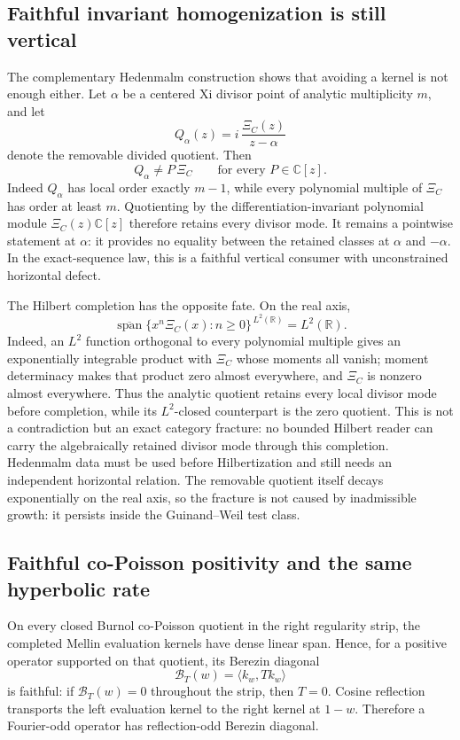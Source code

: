 \documentclass[11pt]{article}
\theoremstyle{definition}
\theoremstyle{remark}
\newcommand{\C}{\mathbb C}
\newcommand{\R}{\mathbb R}
\newcommand{\cB}{\mathcal B}
\begin{document}
\subsection{Faithful invariant homogenization is still vertical}

The complementary Hedenmalm construction shows that avoiding a kernel is
not enough either.  Let \(\alpha\) be a centered Xi divisor point of analytic
multiplicity \(m\), and let
\[
 Q_\alpha(z)=i\,\frac{\Xi_C(z)}{z-\alpha}
\]
denote the removable divided quotient.  Then
\[
        Q_\alpha\ne P\,\Xi_C
        \qquad\text{for every }P\in\C[z].
\tag{5.8e}\label{eq:hedenmalm-invariant-homogenization-faithful}
\]
Indeed \(Q_\alpha\) has local order exactly \(m-1\), while every polynomial
multiple of \(\Xi_C\) has order at least \(m\).  Quotienting by the
differentiation-invariant polynomial module
\(\Xi_C(z)\C[z]\) therefore retains every divisor mode.  It remains a
pointwise statement at \(\alpha\): it provides no equality between the
retained classes at \(\alpha\) and \(-\alpha\).  In the exact-sequence law,
this is a faithful vertical consumer with unconstrained horizontal defect.

The Hilbert completion has the opposite fate.  On the real axis,
\[
 \overline{\operatorname{span}}\{
          x^n\Xi_C(x):n\ge0\}^{\,L^2(\R)}=L^2(\R).
\tag{5.8f}\label{eq:xi-polynomial-density}
\]
Indeed, an \(L^2\) function orthogonal to every polynomial multiple gives
an exponentially integrable product with \(\Xi_C\) whose moments all
vanish; moment determinacy makes that product zero almost everywhere, and
\(\Xi_C\) is nonzero almost everywhere.  Thus the analytic quotient retains
every local divisor mode before completion, while its \(L^2\)-closed
counterpart is the zero quotient.  This is not a contradiction but an exact
category fracture: no bounded Hilbert reader can carry the algebraically
retained divisor mode through this completion.  Hedenmalm data must be used
before Hilbertization and still needs an independent horizontal relation.
The removable quotient itself decays exponentially on the real axis, so the
fracture is not caused by inadmissible growth: it persists inside the
Guinand--Weil test class.

\subsection{Faithful co-Poisson positivity and the same hyperbolic rate}

On every closed Burnol co-Poisson quotient in the right regularity strip,
the completed Mellin evaluation kernels have dense linear span.  Hence,
for a positive operator supported on that quotient, its Berezin diagonal
\[
                         \cB_T(w)=\langle k_w,Tk_w\rangle
\tag{5.9}\label{eq:berezin}
\]
is faithful: if \(\cB_T(w)=0\) throughout the strip, then \(T=0\).
Cosine reflection transports the left evaluation kernel to the right
kernel at \(1-w\).  Therefore a Fourier-odd operator has reflection-odd
Berezin diagonal.
\end{document}
